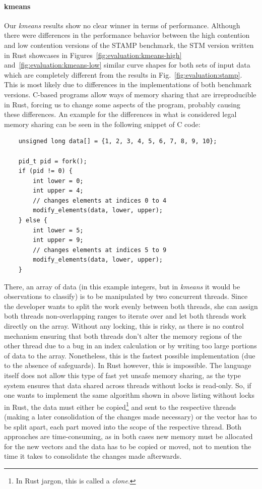 \paragraph{kmeans} Our \emph{kmeans} results show no clear winner in terms of performance.
Although there were differences in the performance behavior between the high contention and low contention versions of the STAMP benchmark, the STM version written in Rust showcases in Figures~\ref{fig:evaluation:kmeans-high} and~\ref{fig:evaluation:kmeans-low} similar curve shapes for both sets of input data which are completely different from the results in Fig.~\ref{fig:evaluation:stamp}.
This is most likely due to differences in the implementations of both benchmark versions.
C-based programs allow ways of memory sharing that are irreproducible in Rust, forcing us to change some aspects of the program, probably causing these differences.
An example for the differences in what is considered legal memory sharing can be seen in the following snippet of C code:
\begin{verbatim}
    unsigned long data[] = {1, 2, 3, 4, 5, 6, 7, 8, 9, 10};

    pid_t pid = fork();
    if (pid != 0) {
        int lower = 0;
        int upper = 4;
        // changes elements at indices 0 to 4
        modify_elements(data, lower, upper);
    } else {
        int lower = 5;
        int upper = 9;
        // changes elements at indices 5 to 9
        modify_elements(data, lower, upper);
    }
\end{verbatim}
There, an array of data (in this example integers, but in \emph{kmeans} it would be observations to classify) is to be manipulated by two concurrent threads.
Since the developer wants to split the work evenly between both threads, she can assign both threads non-overlapping ranges to iterate over and let both threads work directly on the array.
Without any locking, this is risky, as there is no control mechanism ensuring that both threads don't alter the memory regions of the other thread due to a bug in an index calculation or by writing too large portions of data to the array.
Nonetheless, this is the fastest possible implementation (due to the absence of safeguards).
In Rust however, this is impossible.
The language itself does not allow this type of fast yet unsafe memory sharing, as the type system ensures that data shared across threads without locks is read-only.
So, if one wants to implement the same algorithm shown in above listing without locks in Rust, the data must either be copied\footnote{In Rust jargon, this is called a \emph{clone}.} and sent to the respective threads (making a later consolidation of the changes made necessary) or the vector has to be split apart, each part moved into the scope of the respective thread.
Both approaches are time-consuming, as in both cases new memory must be allocated for the new vectors and the data has to be copied or moved, not to mention the time it takes to consolidate the changes made afterwards.

